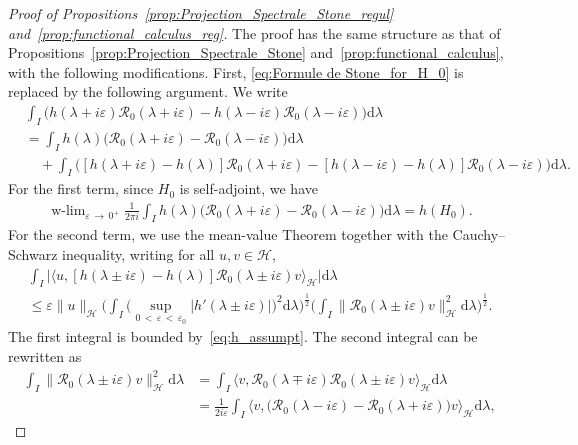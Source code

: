 \documentclass[AHL,Unicode,longabstracts,published]{cedram}
\newcommand{\Hi}{\mathcal{H}}
\newcommand{\rmd}{\mathrm{d}}
\newcommand{\Res}{\mathcal{R}}
\DeclareMathOperator{\wlim}{w-lim}
\newcommand{\Hi}{\mathcal{H}}
\begin{document}
\begin{proof}[Proof of Propositions~\ref{prop:Projection_Spectrale_Stone_regul} and~\ref{prop:functional_calculus_reg}]
The proof has the same structure as that of Propositions~\ref{prop:Projection_Spectrale_Stone} and~\ref{prop:functional_calculus}, with the following modifications. First, \eqref{eq:Formule de Stone_for_H_0} is replaced by the following argument. We write
\begin{align*}
&\int_I\big(h(\lambda+i\varepsilon)\Res_{0}(\lambda+i\varepsilon)-h(\lambda-i\varepsilon)\Res_{0}(\lambda-i\varepsilon)\big)\rmd \lambda\\
&=\int_Ih(\lambda)\big(\Res_{0}(\lambda+i\varepsilon)-\Res_{0}(\lambda-i\varepsilon)\big)\rmd \lambda\\
&\quad+\int_I\big([h(\lambda+i\varepsilon)-h(\lambda)]\Res_{0}(\lambda+i\varepsilon)-[h(\lambda-i\varepsilon)-h(\lambda)]\Res_{0}(\lambda-i\varepsilon)\big)\rmd \lambda.
\end{align*}
For the first term, since $H_0$ is self-adjoint, we have
\begin{align}\label{eq:v1}
\wlim_{\varepsilon\,\rightarrow\,0^+}\frac{1}{2\pi i}\int_Ih(\lambda)\big(\Res_{0}(\lambda+i\varepsilon)-\Res_{0}(\lambda-i\varepsilon)\big)\rmd \lambda=h(H_0). 
\end{align}
For the second term, we use the mean-value Theorem together with the Cauchy--Schwarz inequality, writing for all $u,v\in\Hi$,
\begin{multline}\label{eq:v2}
\int_I\big|\big\langle u,[h(\lambda\pm i\varepsilon)-h(\lambda)]\Res_{0}(\lambda\pm i\varepsilon)v\big\rangle_\Hi\big|\rmd \lambda\\
\le\varepsilon\|u\|_\Hi\Big(\int_I \Big(\sup_{0\,<\,\varepsilon\,<\,\varepsilon_0}|h'(\lambda\pm i\varepsilon)| \Big)^2\rmd \lambda\Big)^{\frac12}\Big(\int_I\big\|\Res_{0}(\lambda\pm i\varepsilon)v\big\|_\Hi^2\rmd \lambda\Big)^{\frac12}. 
\end{multline}
The first integral is bounded by~\eqref{eq:h_assumpt}. The second integral can be rewritten as
\begin{equation}\label{eq:v3}
\begin{split}
\int_I\big\|\Res_{0}(\lambda\pm i\varepsilon)v\big\|_\Hi^2\rmd \lambda &=\int_I\big\langle v,\Res_{0}(\lambda\mp i\varepsilon)\Res_{0}(\lambda\pm i\varepsilon)v\big\rangle_\Hi\rmd \lambda \\
&=\frac{1}{2i\varepsilon}\int_I\big\langle v,\big(\Res_{0}(\lambda-i\varepsilon)-\Res_{0}(\lambda+i\varepsilon)\big)v\big\rangle_\Hi\rmd \lambda, 

\end{split}
\end{equation}
\end{proof}
\end{document}
